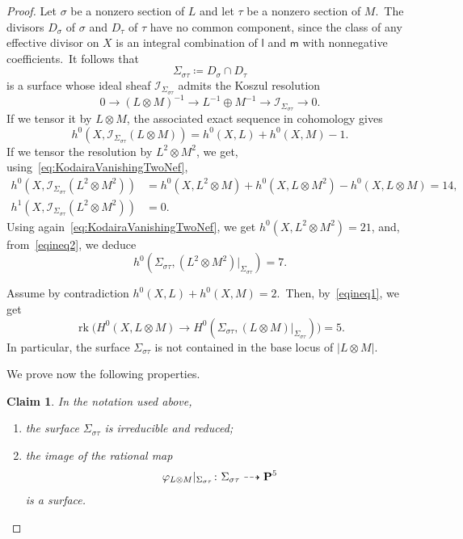 \documentclass[12pt]{amsart}
\def\cI{\mathscr{I}}
\def\P{{\bf P}}
\def\phi{\varphi}
\def\otp{}
\DeclareMathOperator{\rk}{rk}
\def\lra{\longrightarrow}
\def\dra{\dashrightarrow}
\newtheorem{claim}[lemm]{Claim}
\theoremstyle{remark}
\def\lll{\ensuremath{\mathsf l}}
\def\mm{\ensuremath{\mathsf m}}
\begin{document}
\begin{proof}
Let $\sigma$ be a nonzero section of $L$ and let $\tau$ be a nonzero section of $M$.\
The divisors $D_\sigma$ of $\sigma$ and $D_\tau$ of $\tau$   have no common component, since the class of any effective divisor on $X$ is an integral combination of $\lll$ and $\mm$ with nonnegative coefficients.\
It follows that
\[
\Sigma_{\sigma\tau}\coloneqq D_\sigma\cap D_\tau
\]
is a surface whose ideal sheaf $\cI_{\Sigma_{\sigma\tau}}$ admits the Koszul resolution
\begin{equation*}\label{eqkosresSigma}
0\to  (L\otimes M)^{-1}\to    L^{-1}\oplus  M^{-1}\to   \cI_{\Sigma_{\sigma\tau}} \to  0.
\end{equation*}
If we tensor it by $L\otimes M$, the associated  exact sequence in cohomology gives
\begin{equation}\label{eqineq1}
h^0(X,\cI_{\Sigma_{\sigma\tau}}(L\otimes M))=h^0(X,L)+h^0(X,M)-1.
\end{equation}
If we tensor the resolution by $L^{\otp 2}\otimes M^{\otp 2}$, we get, using~\eqref{eq:KodairaVanishingTwoNef},
\begin{equation}\label{eqineq2}
\begin{split}
h^0(X,\cI_{\Sigma_{\sigma\tau}}(L^{\otp 2}\otimes M^{\otp 2}))&=h^0(X,L^{\otp 2}\otimes M)+h^0(X,L\otimes M^{\otp 2})-h^0(X,L\otimes M )=14,\\ h^1(X,\cI_{\Sigma_{\sigma\tau}}(L^{\otp 2}\otimes M^{\otp 2}))&=0.
\end{split}
\end{equation}
Using again~\eqref{eq:KodairaVanishingTwoNef}, we get $h^0(X,L^{\otp 2}\otimes M^{\otp 2})=21$, and, from~\eqref{eqineq2}, we deduce
\begin{equation}\label{eqineq3}
h^0(\Sigma_{\sigma\tau},(L^{\otp 2}\otimes M^{\otp 2})\vert_{\Sigma_{\sigma\tau}})=7.
\end{equation}

Assume by contradiction $h^0(X,L)+h^0(X,M)=2$.\
Then, by~\eqref{eqineq1}, we get
\begin{equation}\label{eqineq4}
\rk \bigl(H^0(X, L\otimes M)\lra  H^0(\Sigma_{\sigma\tau}, ( L\otimes M)\vert_{\Sigma_{\sigma\tau}})\bigr)= 5.
\end{equation}
In particular, the surface $\Sigma_{\sigma\tau}$ is not contained in the base locus of $ |L\otimes M|$.\

We prove now the following properties.

\begin{claim}\label{claimavecc2}
In the notation used above,
\begin{enumerate}[{\rm (a)}]
\item\label{enum:Sigma1} the surface $\Sigma_{\sigma\tau}$ is irreducible and reduced;
\item\label{enum:Sigma2} the image of the rational map
\[
\phi_{L\otimes M}\vert_{\Sigma_{\sigma\tau}}\colon  \Sigma_{\sigma\tau}\dra \P^5
\]
is a surface.
\end{enumerate}
\end{claim}



\end{proof}
\end{document}
